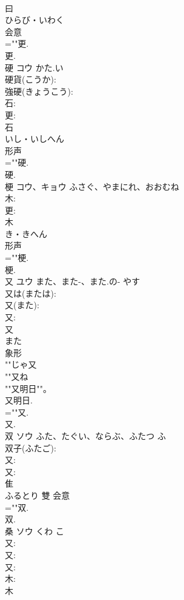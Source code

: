 \documentclass[8pt]{extreport}
\begin{document}
\begin{CJK}{UTF8}{min}
\\	曰	
\\	ひらび・いわく	
\\	会意 
\\	=""更.
\\	更.
\\	硬	コウ	かた.い		
\\	硬貨(こうか): 
\\	強硬(きょうこう): 
\\	石: 
\\	更: 
\\	石	
\\	いし・いしへん	
\\	形声 
\\	=""硬.
\\	硬.
\\	梗	コウ、キョウ	ふさぐ、やまにれ、おおむね		
\\	木: 
\\	更: 
\\	木	
\\	き・きへん	
\\	形声 
\\	=""梗.
\\	梗.
\\	又	ユウ	また、また-、また.の-	やす	
\\	又は(または): 
\\	又(また): 
\\	又: 
\\	又	
\\	また	
\\	象形 
\\	""じゃ又
\\	""又ね
\\	""又明日""。 
\\	又明日.
\\	=""又.
\\	又.
\\	双	ソウ	ふた、たぐい、ならぶ、ふたつ	ふ	
\\	双子(ふたご): 
\\	又: 
\\	又: 
\\	隹	
\\	ふるとり	雙	会意 
\\	=""双.
\\	双.
\\	桑	ソウ	くわ	こ	
\\	又: 
\\	又: 
\\	又: 
\\	木: 
\\	木	

\end{CJK}
\end{document}
